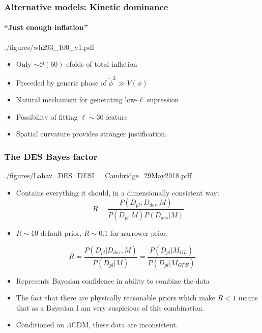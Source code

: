 \documentclass[%
]{beamer}
\begin{document}
\begin{frame}
    \frametitle{Alternative models: Kinetic dominance}
    \framesubtitle{``Just enough inflation''}
    \begin{figleft}[0.6]{./figures/wh293_100_v1.pdf}
        \begin{itemize}
            \item Only $\sim\mathcal{O}(60)$ efolds of total inflation 
            \item Preceded by generic phase of $\dot{\phi}^2\gg V(\phi)$
            \item Natural mechanism for generating low-$\ell$ supression
            \item Possibility of fitting $\ell\sim30$ feature
            \item Spatial curvature provides stronger justification.
        \end{itemize}
    \end{figleft}
\end{frame}

\begin{frame}
    \frametitle{The DES Bayes factor}
    \begin{figleft}[0.5]{./figures/Lahav_DES_DESI__Cambridge_29May2018.pdf}
        \begin{itemize}
            \item Contains everything it should, in a dimensionally consistent way:
                \begin{equation}
                    R = \frac{P(D_{pl},D_{des}|M)}{P(D_{pl}|M)P(D_{des}|M)}  \nonumber
                \end{equation}
            \item $R\sim 10$ default prior, $R\sim 0.1$ for narrower prior.
        \end{itemize}
        \begin{equation}
            R = \frac{P(D_{pl}|D_{des},M)}{P(D_{pl}|M)} = \frac{P(D_{pl}|M_{OL})}{P(D_{pl}|M_{GPE})} \nonumber
        \end{equation}
    \end{figleft}
    \begin{itemize}
        \item Represents Bayesian confidence in ability to combine the data
        \item The fact that there are physically reasonable priors which make $R<1$ means that as a Bayesian I am very suspicious of this combination.
        \item Conditioned on $\Lambda$CDM, these data are inconsistent.
    \end{itemize}
\end{frame}

%
% 
\end{document}
